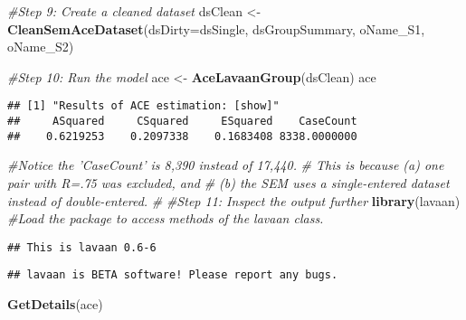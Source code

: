 \documentclass[smallextended]{svjour3}       %
\newenvironment{Shaded}{\begin{snugshade}}{\end{snugshade}}
\newcommand{\CommentTok}[1]{\textcolor[rgb]{0.56,0.35,0.01}{\textit{#1}}}
\newcommand{\DataTypeTok}[1]{\textcolor[rgb]{0.13,0.29,0.53}{#1}}
\newcommand{\KeywordTok}[1]{\textcolor[rgb]{0.13,0.29,0.53}{\textbf{#1}}}
\newcommand{\NormalTok}[1]{#1}
\newcommand{\StringTok}[1]{\textcolor[rgb]{0.31,0.60,0.02}{#1}}
\begin{document}
\begin{Shaded}
\begin{Highlighting}[]
\CommentTok{#Step 9: Create a cleaned dataset}
\NormalTok{dsClean <-}\StringTok{ }\KeywordTok{CleanSemAceDataset}\NormalTok{(}\DataTypeTok{dsDirty=}\NormalTok{dsSingle, dsGroupSummary, oName_S1, oName_S2)}

\CommentTok{#Step 10: Run the model}
\NormalTok{ace <-}\StringTok{ }\KeywordTok{AceLavaanGroup}\NormalTok{(dsClean)}
\NormalTok{ace}
\end{Highlighting}
\end{Shaded}

\begin{verbatim}
## [1] "Results of ACE estimation: [show]"
##     ASquared     CSquared     ESquared    CaseCount 
##    0.6219253    0.2097338    0.1683408 8338.0000000
\end{verbatim}

\begin{Shaded}
\begin{Highlighting}[]
\CommentTok{#Notice the 'CaseCount' is 8,390 instead of 17,440.}
\CommentTok{#  This is because (a) one pair with R=.75 was excluded, and}
\CommentTok{#  (b) the SEM uses a single-entered dataset instead of double-entered.}
\CommentTok{#}
\CommentTok{#Step 11: Inspect the output further}
\KeywordTok{library}\NormalTok{(lavaan) }\CommentTok{#Load the package to access methods of the lavaan class.}
\end{Highlighting}
\end{Shaded}

\begin{verbatim}
## This is lavaan 0.6-6
\end{verbatim}

\begin{verbatim}
## lavaan is BETA software! Please report any bugs.
\end{verbatim}

\begin{Shaded}
\begin{Highlighting}[]
\KeywordTok{GetDetails}\NormalTok{(ace)}
\end{Highlighting}
\end{Shaded}
\end{document}
